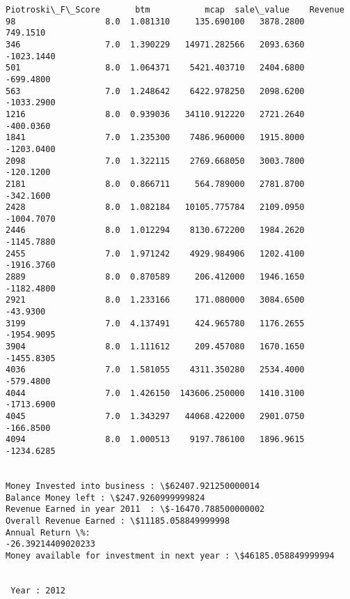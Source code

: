 \documentclass[11pt]{article}
\begin{document}
\begin{Verbatim}[commandchars=\\\{\}]
      Piotroski\_F\_Score       btm           mcap  sale\_value    Revenue
98                  8.0  1.081310     135.690100   3878.2800   749.1510
346                 7.0  1.390229   14971.282566   2093.6360 -1023.1440
501                 8.0  1.064371    5421.403710   2404.6800  -699.4800
563                 7.0  1.248642    6422.978250   2098.6200 -1033.2900
1216                8.0  0.939036   34110.912220   2721.2640  -400.0360
1841                7.0  1.235300    7486.960000   1915.8000 -1203.0400
2098                7.0  1.322115    2769.668050   3003.7800  -120.1200
2181                8.0  0.866711     564.789000   2781.8700  -342.1600
2428                8.0  1.082184   10105.775784   2109.0950 -1004.7070
2446                8.0  1.012294    8130.672200   1984.2620 -1145.7880
2455                7.0  1.971242    4929.984906   1202.4100 -1916.3760
2889                8.0  0.870589     206.412000   1946.1650 -1182.4800
2921                8.0  1.233166     171.080000   3084.6500   -43.9300
3199                7.0  4.137491     424.965780   1176.2655 -1954.9095
3904                8.0  1.111612     209.457080   1670.1650 -1455.8305
4036                7.0  1.581055    4311.350280   2534.4000  -579.4800
4044                7.0  1.426150  143606.250000   1410.3100 -1713.6900
4045                7.0  1.343297   44068.422000   2901.0750  -166.8500
4094                8.0  1.000513    9197.786100   1896.9615 -1234.6285


Money Invested into business : \$62407.921250000014
Balance Money left : \$247.9260999999824
Revenue Earned in year 2011  : \$-16470.788500000002
Overall Revenue Earned : \$11185.058849999998
Annual Return \%:
-26.39214409020233
Money available for investment in next year : \$46185.058849999994


 Year : 2012


\end{Verbatim}
\end{document}
